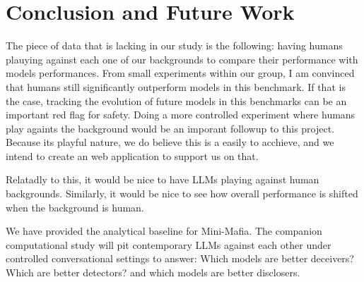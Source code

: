 \documentclass{article}
\begin{document}
\section{Conclusion and Future Work}

The piece of data that is lacking in our study is the following: having humans plauying against each one of our backgrounds to compare their performance with models performances.
From small experiments within our group, I am convinced that humans still significantly outperform models in this benchmark. If that is the case, tracking the evolution of future models in this benchmarks can be an important red flag for safety.
Doing a more controlled experiment where humans play againts the background would be an imporant followup to this project.
Because its playful nature, we do believe this is a easily to acchieve, and we intend to create an web application to support us on that.

Relatadly to this, it would be nice to have LLMs playing against human backgrounds. Similarly, it would be nice to see how overall performance is shifted when the background is human. 


We have provided the analytical baseline for Mini-Mafia.  The companion computational study will pit contemporary LLMs against each other under controlled conversational settings to answer: Which models are better deceivers?  Which are better detectors? and which models are better disclosers.
\end{document}
